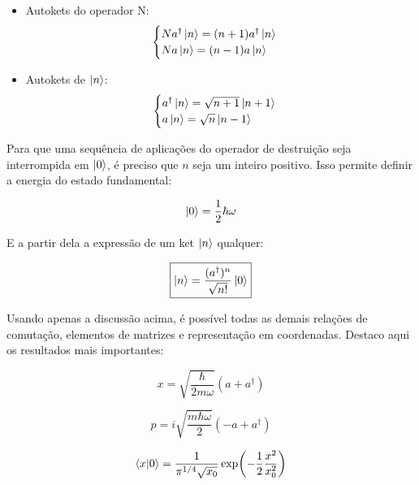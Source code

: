 \documentclass[12pt,a4paper]{report}
\begin{document}
\begin{itemize}
    \item Autokets do operador N:
    \begin{equation*}
        \begin{cases}
            Na^{\dag}\ket{n}=(n+1)a^{\dag}\ket{n}\\
            Na\ket{n}=(n-1)a\ket{n}
        \end{cases}
    \end{equation*}
    \item Autokets de $\ket{n}$:
    \begin{equation*}
        \begin{cases}
            a^{\dag}\ket{n}=\sqrt{n+1}\ket{n+1}\\
            a\ket{n}=\sqrt{n}\ket{n-1}
        \end{cases}
        \label{efeito.cria.anaq}
    \end{equation*}
\end{itemize}

Para que uma sequência de aplicações do operador de destruição seja interrompida em $\ket{0}$, é preciso que $n$ seja um inteiro positivo. Isso permite definir a energia do estado fundamental:

\begin{equation*}
    \ket{0}=\frac{1}{2}\hbar\omega
\end{equation*}

E a partir dela a expressão de um ket $\ket{n}$ qualquer:

\begin{equation}
    \boxed{\ket{n}={\frac{(a^{\dag})^n}{\sqrt{n!}}}\ket{0}}
\end{equation}

Usando apenas a discussão acima, é possível todas as demais relações de comutação, elementos de matrizes e representação em coordenadas. Destaco aqui os resultados mais importantes:

\begin{equation*}
    x=\sqrt{\frac{\hbar}{2m\omega}}(a+a^{\dag})
\end{equation*}

\begin{equation*}
    p=i\sqrt{\frac{m\hbar\omega}{2}}(-a+a^{\dag})
\end{equation*}

\begin{equation}
    \braket{x}{0}=\frac{1}{\pi^{1/4}\sqrt{x_0}}\exp(-\frac{1}{2}\frac{x^2}{x^2_0})
\end{equation}
\end{document}
